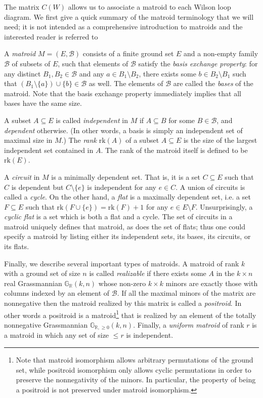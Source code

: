 \documentclass[11pt]{article}
\newcommand{\R}{\mathbb{R}}
\newcommand{\Gr}{\mathbb{G}_{\R, \geq 0}}
\newcommand{\rk}{\textrm{rk} }
\newcommand{\cB}{\mathcal{B}}
\theoremstyle{remark}
\theoremstyle{definition}
\begin{document}
The matrix $C(W)$ allows us to associate a matroid to each Wilson loop diagram. We first give a quick summary of the matroid terminology that we will need; it is not intended as a comprehensive introduction to matroids and the interested reader is referred to \cite{OxleyMatroidBook} 

A {\em matroid} $M = (E,\cB)$ consists of a finite ground set $E$ and a non-empty family $\cB$ of subsets of $E$, such that elements of $\cB$ satisfy the {\em basis exchange property}: for any distinct $B_1,B_2 \in \cB$ and any $a \in B_1 \setminus B_2$, there exists some $b \in B_2 \setminus B_1$ such that $(B_1 \setminus \{a\})\cup \{b\} \in \cB$ as well. The elements of $\cB$ are called the {\em bases} of the matroid. Note that the basis exchange property immediately implies that all bases have the same size.

A subset $A \subseteq E$ is called {\em independent} in $M$ if $A \subseteq B$ for some $B \in \cB$, and {\em dependent} otherwise. (In other words, a basis is simply an independent set of maximal size in $M$.) The {\em rank}  $\rk(A)$ of a subset $A \subseteq E$ is the size of the largest independent set contained in $A$. The rank of the matroid itself is defined to be $\rk(E)$.

A {\em circuit} in $M$ is a minimally dependent set. That is, it is a set $C \subseteq E$ such that $C$ is dependent but $C \setminus \{e\}$ is independent for any $e \in C$. A union of circuits is called a {\em cycle}. On the other hand, a {\em flat} is a maximally dependent set, i.e. a set $F \subseteq E$ such that $\rk(F \cup \{e\}) = \rk(F) + 1$ for any $e \in E \setminus F$. Unsurprisingly, a {\em cyclic flat} is a set which is both a flat and a cycle. The set of circuits in a matroid uniquely defines that matroid, as does the set of flats; thus one could specify a matroid by listing either its independent sets, its bases, its circuits, or its flats.

Finally, we describe several important types of matroids. A matroid of rank $k$ with a ground set of size $n$ is called {\em realizable} if there exists some $A$ in the $k\times n$ real Grassmannian $\mathbb{G}_{\mathbb{R}}(k,n)$ whose non-zero $k\times k$ minors are exactly those with columns indexed by an element of $\cB$. If all the maximal minors of the matrix are nonnegative then the matroid realized by this matrix is called a {\em positroid}.  In other words a positroid is a matroid\footnote{Note that matroid isomorphism allows arbitrary permutations of the ground set, while positroid isomorphism only allows cyclic permutations in order to preserve the nonnegativity of the minors.  In particular, the property of being a positroid is not preserved under matroid isomorphism.} that is realized by an element of the totally nonnegative Grassmannian $\Gr(k,n)$. Finally, a {\em uniform matroid} of rank $r$ is a matroid in which any set of size $\leq r$ is independent.
\end{document}
